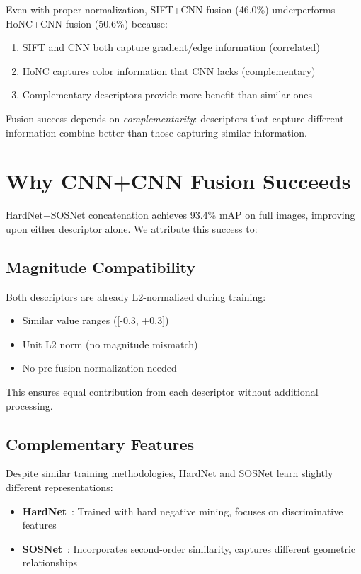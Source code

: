 Even with proper normalization, SIFT+CNN fusion (46.0\%) underperforms HoNC+CNN fusion (50.6\%) because:
\begin{enumerate}
    \item SIFT and CNN both capture gradient/edge information (correlated)
    \item HoNC captures color information that CNN lacks (complementary)
    \item Complementary descriptors provide more benefit than similar ones
\end{enumerate}

Fusion success depends on \textit{complementarity}: descriptors that capture different information combine better than those capturing similar information.

\section{Why CNN+CNN Fusion Succeeds}

HardNet+SOSNet concatenation achieves 93.4\% mAP on full images, improving upon either descriptor alone. We attribute this success to:

\subsection{Magnitude Compatibility}

Both descriptors are already L2-normalized during training:
\begin{itemize}
    \item Similar value ranges ([-0.3, +0.3])
    \item Unit L2 norm (no magnitude mismatch)
    \item No pre-fusion normalization needed
\end{itemize}

This ensures equal contribution from each descriptor without additional processing.

\subsection{Complementary Features}

Despite similar training methodologies, HardNet and SOSNet learn slightly different representations:
\begin{itemize}
    \item \textbf{HardNet}~\cite{mishchuk2017working}: Trained with hard negative mining, focuses on discriminative features
    \item \textbf{SOSNet}~\cite{tian2019sosnet}: Incorporates second-order similarity, captures different geometric relationships
\end{itemize}

